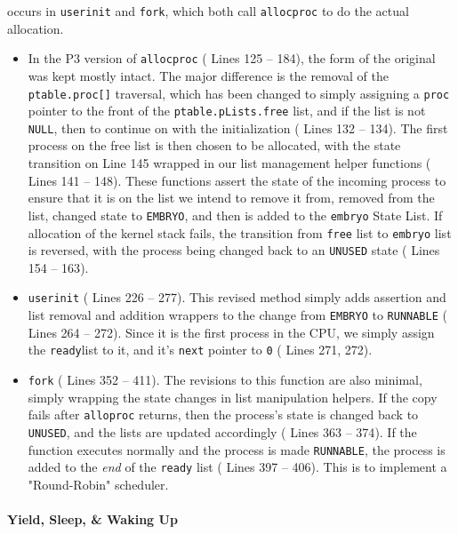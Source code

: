 \documentclass[11pt,letterpaper]{report}
\begin{document}
	occurs in {\tt userinit} and {\tt fork}, which both call {\tt allocproc} to do the actual allocation. 
	\begin{itemize}
		
	\item In the P3 version of {\tt allocproc} ({\color{red} Lines 125 -- 184}), the form of the original was kept mostly intact. The major difference is the removal of the {\tt ptable.proc[]} traversal, which has been changed to simply assigning a {\tt proc} pointer to the front of the {\tt ptable.pLists.free} list, and if the list is not {\tt NULL}, then to continue on with the initialization ({\color{red} Lines 132 -- 134}).
	The first process on the free list is then chosen to be allocated, with the state transition on {\color{red} Line 145} wrapped in our list management helper functions ({\color{red} Lines 141 -- 148}). These functions assert the state of the incoming process to ensure that it is on the list we intend to remove it from, removed from the list, changed state to {\tt EMBRYO}, and then is added to the {\tt embryo} State List. If allocation of the kernel stack fails, the transition from {\tt free} list to {\tt embryo} list is reversed, with the process being changed back to an {\tt UNUSED} state ({\color{red} Lines 154 -- 163}).
	
	\item {\tt userinit} ({\color{red} Lines  226 -- 277}). This revised method simply adds assertion and list removal and addition wrappers to the change from {\tt EMBRYO} to {\tt RUNNABLE} ({\color{red} Lines 264 -- 272}). Since it is the first process in the CPU, we simply assign the {\tt ready}list to it, and it's {\tt next} pointer to {\tt 0} ({\color{red} Lines 271, 272}).
	
	\item {\tt fork} ({\color{red} Lines 352 -- 411}). The revisions to this function are also minimal, simply wrapping the state changes in list manipulation helpers. If the copy fails after {\tt alloproc} returns, then the process's state is changed back to {\tt UNUSED}, and the lists are updated accordingly ({\color{red} Lines 363 -- 374}). If the function executes normally and the process is made {\tt RUNNABLE}, the process is added to the \emph{end} of the {\tt ready} list ({\color{red} Lines 397 -- 406}). This is to implement a "Round-Robin" scheduler.
	
	\end{itemize}

	\paragraph{Yield, Sleep, \& Waking Up}
	
\end{document}
